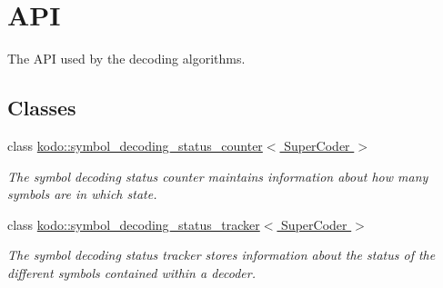 \hypertarget{group__decoder__api}{\section{A\-P\-I}
\label{group__decoder__api}
}


The A\-P\-I used by the decoding algorithms.  


\subsection*{Classes}
\begin{DoxyCompactItemize}
\item 
class \hyperlink{classkodo_1_1symbol__decoding__status__counter}{kodo\-::symbol\-\_\-decoding\-\_\-status\-\_\-counter$<$ Super\-Coder $>$}
\begin{DoxyCompactList}\small\item\em The symbol decoding status counter maintains information about how many symbols are in which state. \end{DoxyCompactList}\item 
class \hyperlink{classkodo_1_1symbol__decoding__status__tracker}{kodo\-::symbol\-\_\-decoding\-\_\-status\-\_\-tracker$<$ Super\-Coder $>$}
\begin{DoxyCompactList}\small\item\em The symbol decoding status tracker stores information about the status of the different symbols contained within a decoder. \end{DoxyCompactList}\end{DoxyCompactItemize}
